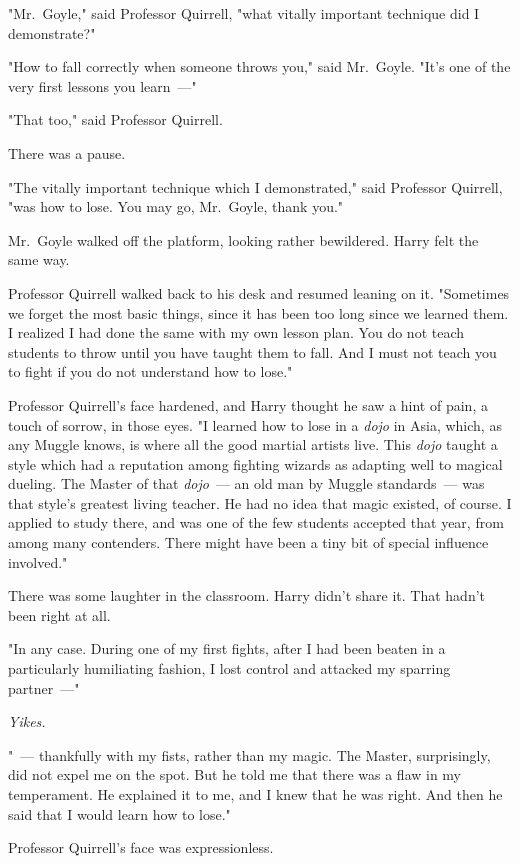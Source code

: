"Mr.~Goyle," said Professor Quirrell, "what vitally important technique did I
demonstrate?"

"How to fall correctly when someone throws you," said Mr.~Goyle. "It's one of
the very first lessons you learn~---"

"That too," said Professor Quirrell.

There was a pause.

"The vitally important technique which I demonstrated," said Professor
Quirrell, "was how to lose. You may go, Mr.~Goyle, thank you."

Mr.~Goyle walked off the platform, looking rather bewildered. Harry felt the
same way.

Professor Quirrell walked back to his desk and resumed leaning on it.
"Sometimes we forget the most basic things, since it has been too long since we
learned them. I realized I had done the same with my own lesson plan. You do
not teach students to throw until you have taught them to fall. And I must not
teach you to fight if you do not understand how to lose."

Professor Quirrell's face hardened, and Harry thought he saw a hint of pain, a
touch of sorrow, in those eyes. "I learned how to lose in a \emph{dojo} in
Asia, which, as any Muggle knows, is where all the good martial artists live.
This \emph{dojo} taught a style which had a reputation among fighting wizards
as adapting well to magical dueling. The Master of that \emph{dojo}~--- an old
man by Muggle standards~--- was that style's greatest living teacher. He had no
idea that magic existed, of course. I applied to study there, and was one of
the few students accepted that year, from among many contenders. There might
have been a tiny bit of special influence involved."

There was some laughter in the classroom. Harry didn't share it. That hadn't
been right at all.

"In any case. During one of my first fights, after I had been beaten in a
particularly humiliating fashion, I lost control and attacked my sparring
partner~---"

\emph{Yikes.}

"~--- thankfully with my fists, rather than my magic. The Master, surprisingly,
did not expel me on the spot. But he told me that there was a flaw in my
temperament. He explained it to me, and I knew that he was right. And then he
said that I would learn how to lose."

Professor Quirrell's face was expressionless.

